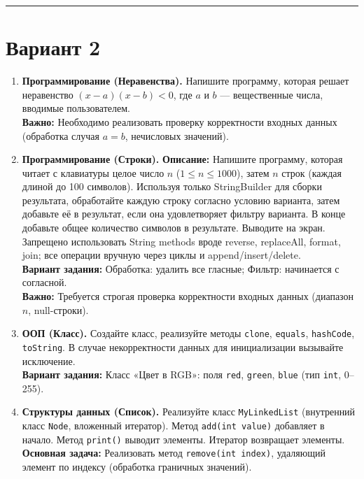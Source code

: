 \documentclass[10pt,a4paper]{article}
\begin{document}
\vspace{1cm}
\hrule
\vspace{1cm}

\section*{Вариант 2}

\begin{enumerate}
    \item \textbf{Программирование (Неравенства).} Напишите программу, которая решает неравенство $(x - a)(x - b) < 0$, где $a$ и $b$ — вещественные числа, вводимые пользователем. \\
    \textbf{Важно:} Необходимо реализовать проверку корректности входных данных (обработка случая $a = b$, нечисловых значений).
    
    \item \textbf{Программирование (Строки).} \textbf{Описание:} Напишите программу, которая читает с клавиатуры целое число $n$ ($1 \leq n \leq 1000$), затем $n$ строк (каждая длиной до 100 символов). Используя только StringBuilder для сборки результата, обработайте каждую строку согласно условию варианта, затем добавьте её в результат, если она удовлетворяет фильтру варианта. В конце добавьте общее количество символов в результате. Выводите на экран. Запрещено использовать String methods вроде reverse, replaceAll, format, join; все операции вручную через циклы и append/insert/delete. \\
    \textbf{Вариант задания:} Обработка: удалить все гласные; Фильтр: начинается с согласной. \\
    \textbf{Важно:} Требуется строгая проверка корректности входных данных (диапазон $n$, null-строки).
    
    \item \textbf{ООП (Класс).} Создайте класс, реализуйте методы \texttt{clone}, \texttt{equals}, \texttt{hashCode}, \texttt{toString}. В случае некорректности данных для инициализации вызывайте исключение. \\
    \textbf{Вариант задания:} Класс «Цвет в RGB»: поля \texttt{red}, \texttt{green}, \texttt{blue} (тип \texttt{int}, 0–255).
    
    \item \textbf{Структуры данных (Список).} Реализуйте класс \texttt{MyLinkedList} (внутренний класс \texttt{Node}, вложенный итератор). Метод \texttt{add(int value)} добавляет в начало. Метод \texttt{print()} выводит элементы. Итератор возвращает элементы. \\
    \textbf{Основная задача:} Реализовать метод \texttt{remove(int index)}, удаляющий элемент по индексу (обработка граничных значений).
\end{enumerate}
\end{document}
